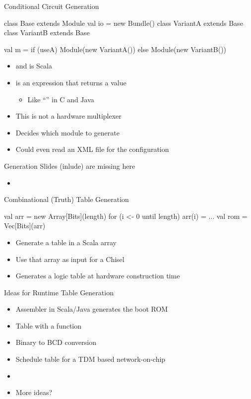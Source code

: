 \begin{frame}[fragile]{Conditional Circuit Generation}
\begin{chisel}
class Base extends Module { val io = new Bundle() }
class VariantA extends Base { }
class VariantB extends Base { }

val m = if (useA) Module(new VariantA())
        else Module(new VariantB())
\end{chisel}
\begin{itemize}
\item {} and  is Scala
\item {} is an expression that returns a value
\begin{itemize}
\item Like ``'' in C and Java
\end{itemize}
\item This is not a hardware multiplexer
\item Decides which module to generate
\item Could even read an XML file for the configuration
\end{itemize}
\end{frame}

%

\begin{frame}[fragile]{Generation Slides (inlude) are missing here}
\begin{itemize}
\item 
\end{itemize}
\end{frame}

\begin{frame}[fragile]{Combinational (Truth) Table Generation}
\begin{chisel}
val arr = new Array[Bits](length)
for (i <- 0 until length) {
  arr(i) = ...
}
val rom = Vec[Bits](arr)
\end{chisel}
\begin{itemize}
\item Generate a table in a Scala array
\item Use that array as input for a Chisel 
\item Generates a logic table at hardware construction time
\end{itemize}
\end{frame}

\begin{frame}[fragile]{Ideas for Runtime Table Generation}
\begin{itemize}
\item Assembler in Scala/Java generates the boot ROM
\item Table with a  function
\item Binary to BCD conversion
\item Schedule table for a TDM based network-on-chip
\item 
\item More ideas?
\end{itemize}
\end{frame}

